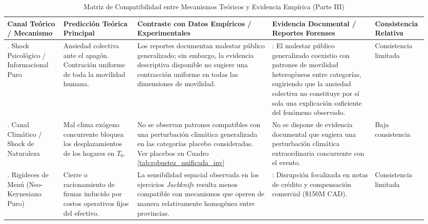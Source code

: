\begin{table}[H]
    \centering
    \caption{Matriz de Compatibilidad entre Mecanismos Te\'oricos y Evidencia Emp\'irica (Parte III)}
    \label{tab:viabilidad_canales_p3}
    \small
    \setlength{\tabcolsep}{4pt} 
    \begin{tabularx}{\textwidth}{>{\raggedright\arraybackslash}p{2.8cm}XXX>{\raggedright\arraybackslash}p{2.3cm}}
        \toprule
        \textbf{Canal Te\'orico / Mecanismo} & \textbf{Predicci\'on Te\'orica Principal} & \textbf{Contraste con Datos Emp\'iricos / Experimentales} & \textbf{Evidencia Documental / Reportes Forenses} & \textbf{Consistencia Relativa} \\
        \midrule
        5. Shock Psicol\'ogico / \newline Informacional Puro & Ansiedad colectiva ante el apag\'on. Contraci\'on uniforme de toda la movilidad humana. & Los reportes documentan malestar p\'ublico generalizado; sin embargo, la evidencia descriptiva disponible no sugiere una contracci\'on uniforme en todas las dimensiones de movilidad. & \parencite{pollara2022}: El malestar p\'ublico generalizado coexistio con patrones de movilidad heterog\'eneos entre categor\'ias, sugiriendo que la ansiedad colectiva no constituye por s\'i sola una explicaci\'on suficiente del fen\'omeno observado. & Consistencia limitada \\
        \addlinespace
        6. Canal Clim\'atico / \newline Shock de Naturaleza & Mal clima ex\'ogeno concurrente bloquea los desplazamientos de los hogares en $T_0$. & No se observan patrones compatibles con una perturbaci\'on clim\'atica generalizada en las categor\'ias placebo consideradas. Ver placebos en Cuadro \ref{tab:robustez_unificada_inv} & No se dispone de evidencia documental que sugiera una perturbaci\'on clim\'atica extraordinaria concurrente con el evento. & Baja consistencia \\
        \addlinespace
        7. Rigideces de Men\'u \newline (Neo-Keynesiano Puro) & Cierre o racionamiento de firmas inducido por costos operativos fijos del efectivo. & La sensibilidad espacial observada en los ejercicios \textit{Jackknife} resulta menos compatible con mecanismos que operen de manera relativamente homog\'enea entre provincias. & \parencite{rogers2022q3}: Disrupci\'on focalizada en notas de cr\'edito y compensaci\'on comercial (\$150M CAD). & Consistencia limitada \\
        \bottomrule
    \end{tabularx}

\end{table}
